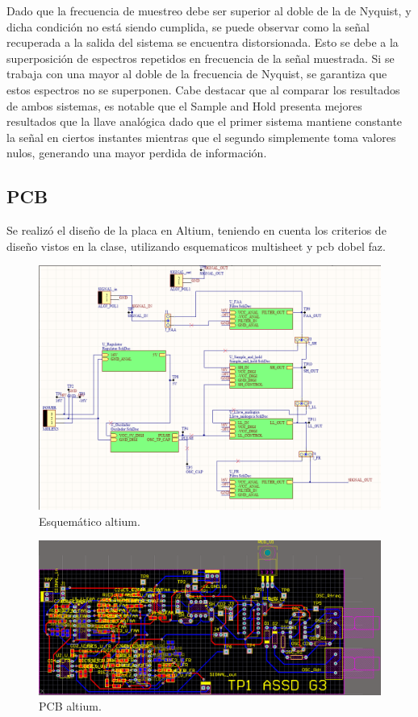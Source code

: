 Dado que la frecuencia de muestreo debe ser superior al doble de la de Nyquist, y dicha condición no está siendo cumplida, se puede observar como la señal recuperada a la salida del sistema se encuentra distorsionada. Esto se debe a la superposición de espectros repetidos en frecuencia de la señal muestrada. Si se trabaja con una mayor al doble de la frecuencia de Nyquist, se garantiza que estos espectros no se superponen. Cabe destacar que al comparar los resultados de ambos sistemas, es notable que el Sample and Hold presenta mejores resultados que la llave analógica dado que el primer sistema mantiene constante la señal en ciertos instantes mientras que el segundo simplemente toma valores nulos, generando una mayor perdida de información.
\subsection{PCB}
Se realizó el diseño de la placa en Altium, teniendo en cuenta los criterios de diseño vistos en la clase, utilizando esquematicos multisheet y pcb dobel faz.
\begin{figure}[H]
\centering
	\includegraphics[width=0.8\linewidth]{ImagenesEjercicio6/main.png}
	\caption{Esquemático altium.}
	\label{fig:esq}
\end{figure}
\begin{figure}[H]
\centering
	\includegraphics[width=1\linewidth]{ImagenesEjercicio6/placa.png}
	\caption{PCB altium.}
	\label{fig:pcb}
\end{figure}